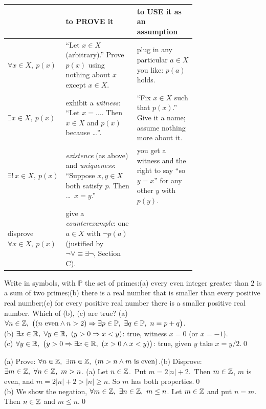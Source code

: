 \begin{strategy}
\begin{center}\small
\begin{tabular}{@{}l p{0.40\linewidth} p{0.33\linewidth}@{}}
\toprule
 & \textbf{to PROVE it} & \textbf{to USE it as an assumption}\\
\midrule
$\forall x\in X,\ p(x)$ & ``Let $x\in X$ (arbitrary).'' Prove $p(x)$ using nothing about $x$ except $x\in X$. & plug in any particular $a\in X$ you like: $p(a)$ holds.\\[2pt]
$\exists x\in X,\ p(x)$ & exhibit a \emph{witness}: ``Let $x=\dots$. Then $x\in X$ and $p(x)$ because \dots''. & ``Fix $x\in X$ such that $p(x)$.'' Give it a name; assume nothing more about it.\\[2pt]
$\exists!\,x\in X,\ p(x)$ & \emph{existence} (as above) and \emph{uniqueness}: ``Suppose $x,y\in X$ both satisfy $p$. Then \dots\ $x=y$.'' & you get a witness and the right to say ``so $y=x$'' for any other $y$ with $p(y)$.\\[2pt]
disprove $\forall x\in X,\ p(x)$ & give a \emph{counterexample}: one $a\in X$ with $\neg p(a)$ (justified by $\neg\forall\equiv\exists\neg$, Section C). & \\
\bottomrule
\end{tabular}
\end{center}
\end{strategy}

\begin{hexample}
Write in symbols, with $\mathbb P$ the set of primes:\quad (a) every even integer greater than $2$ is a sum of two primes;\quad (b) there is a real number that is smaller than every positive real number;\quad (c) for every positive real number there is a smaller positive real number. Which of (b), (c) are true?
\solution
(a) $\forall n\in\Z,\ \big((n \text{ even}\wedge n>2)\Rightarrow\exists p\in\mathbb P,\ \exists q\in\mathbb P,\ n=p+q\big)$.\\
(b) $\exists x\in\R,\ \forall y\in\R,\ (y>0\Rightarrow x<y)$: true, witness $x=0$ (or $x=-1$).\\
(c) $\forall y\in\R,\ \big(y>0\Rightarrow\exists x\in\R,\ (x>0\wedge x<y)\big)$: true, given $y$ take $x=y/2$.\qed
\end{hexample}

\begin{hexample}
(a) Prove: $\forall n\in\mathbb{Z},\ \exists m\in\mathbb{Z},\ (m>n\wedge m\text{ is even})$.\quad (b) Disprove: $\exists m\in\mathbb{Z},\ \forall n\in\mathbb{Z},\ m>n$.
\solution
(a) Let $n\in\mathbb{Z}$.\ Put $m=2|n|+2$.\ Then $m\in\mathbb{Z}$, $m$ is even, and $m=2|n|+2>|n|\ge n$. So $m$ has both properties.\qed\\[2pt]
(b) We show the negation, $\forall m\in\Z,\ \exists n\in\Z,\ m\le n$. Let $m\in\mathbb{Z}$ and put $n=m$. Then $n\in\mathbb{Z}$ and $m\le n$.\qed
\end{hexample}

